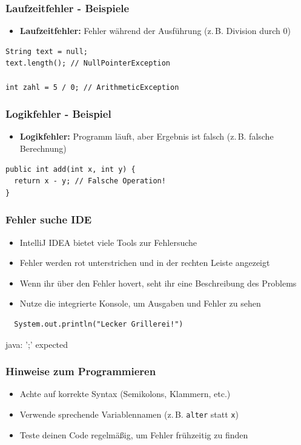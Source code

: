 \documentclass{../../presentation}
\begin{document}
\begin{frame}[fragile]
  \frametitle{Laufzeitfehler - Beispiele}
  \begin{itemize}
    \item \textbf{Laufzeitfehler:} Fehler während der Ausführung (z.\,B. Division durch 0)
  \end{itemize}
  \begin{verbatim}
String text = null;
text.length(); // NullPointerException

int zahl = 5 / 0; // ArithmeticException
  \end{verbatim}
\end{frame}

\begin{frame}[fragile]
  \frametitle{Logikfehler - Beispiel}
  \begin{itemize}
    \item \textbf{Logikfehler:} Programm läuft, aber Ergebnis ist falsch (z.\,B. falsche Berechnung)
  \end{itemize}
  \begin{verbatim}
public int add(int x, int y) {
  return x - y; // Falsche Operation!
}
  \end{verbatim}
\end{frame}

\begin{frame}[fragile]
  \frametitle{Fehler suche IDE}
  \pause
  \begin{itemize}
    \item IntelliJ IDEA bietet viele Tools zur Fehlersuche
          \pause
    \item Fehler werden rot unterstrichen und in der rechten Leiste angezeigt
          \pause
    \item Wenn ihr über den Fehler hovert, seht ihr eine Beschreibung des Problems
          \pause
    \item Nutze die integrierte Konsole, um Ausgaben und Fehler zu sehen \newline
  \end{itemize}
  \begin{verbatim}
  System.out.println("Lecker Grillerei!")
  \end{verbatim}
  \pause
  \begin{ausgabe}
    \color{red}java: ';' expected
  \end{ausgabe}
\end{frame}

\begin{frame}[fragile]
  \frametitle{Hinweise zum Programmieren}
  \pause
  \begin{itemize}
    \item Achte auf korrekte Syntax (Semikolons, Klammern, etc.)
          \pause
    \item Verwende sprechende Variablennamen (z.\,B. \texttt{alter} statt \texttt{x})
          \pause
    \item Teste deinen Code regelmäßig, um Fehler frühzeitig zu finden
  \end{itemize}
\end{frame}
\end{document}
